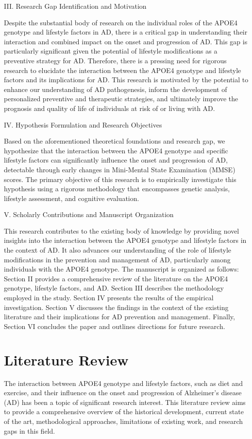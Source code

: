 \documentclass[conference]{IEEEtran}
\begin{document}
III. Research Gap Identification and Motivation

Despite the substantial body of research on the individual roles of the APOE4 genotype and lifestyle factors in AD, there is a critical gap in understanding their interaction and combined impact on the onset and progression of AD. This gap is particularly significant given the potential of lifestyle modifications as a preventive strategy for AD. Therefore, there is a pressing need for rigorous research to elucidate the interaction between the APOE4 genotype and lifestyle factors and its implications for AD. This research is motivated by the potential to enhance our understanding of AD pathogenesis, inform the development of personalized preventive and therapeutic strategies, and ultimately improve the prognosis and quality of life of individuals at risk of or living with AD.

IV. Hypothesis Formulation and Research Objectives

Based on the aforementioned theoretical foundations and research gap, we hypothesize that the interaction between the APOE4 genotype and specific lifestyle factors can significantly influence the onset and progression of AD, detectable through early changes in Mini-Mental State Examination (MMSE) scores. The primary objective of this research is to empirically investigate this hypothesis using a rigorous methodology that encompasses genetic analysis, lifestyle assessment, and cognitive evaluation.

V. Scholarly Contributions and Manuscript Organization

This research contributes to the existing body of knowledge by providing novel insights into the interaction between the APOE4 genotype and lifestyle factors in the context of AD. It also advances our understanding of the role of lifestyle modifications in the prevention and management of AD, particularly among individuals with the APOE4 genotype. The manuscript is organized as follows: Section II provides a comprehensive review of the literature on the APOE4 genotype, lifestyle factors, and AD. Section III describes the methodology employed in the study. Section IV presents the results of the empirical investigation. Section V discusses the findings in the context of the existing literature and their implications for AD prevention and management. Finally, Section VI concludes the paper and outlines directions for future research.

\section{Literature Review}
The interaction between APOE4 genotype and lifestyle factors, such as diet and exercise, and their influence on the onset and progression of Alzheimer's disease (AD) has been a topic of significant research interest. This literature review aims to provide a comprehensive overview of the historical development, current state of the art, methodological approaches, limitations of existing work, and research gaps in this field.
\end{document}

